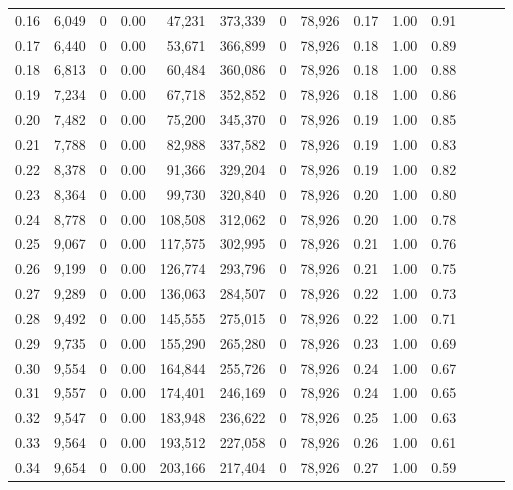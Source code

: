 \begin{tabular}{rrrrrrrrrrrrrr}
0.16 &  6,049 &      0 &  0.00 &   47,231 &  373,339 &       0 &  78,926 &  0.17 &  1.00 &      0.91 \\
0.17 &  6,440 &      0 &  0.00 &   53,671 &  366,899 &       0 &  78,926 &  0.18 &  1.00 &      0.89 \\
0.18 &  6,813 &      0 &  0.00 &   60,484 &  360,086 &       0 &  78,926 &  0.18 &  1.00 &      0.88 \\
0.19 &  7,234 &      0 &  0.00 &   67,718 &  352,852 &       0 &  78,926 &  0.18 &  1.00 &      0.86 \\
0.20 &  7,482 &      0 &  0.00 &   75,200 &  345,370 &       0 &  78,926 &  0.19 &  1.00 &      0.85 \\
0.21 &  7,788 &      0 &  0.00 &   82,988 &  337,582 &       0 &  78,926 &  0.19 &  1.00 &      0.83 \\
0.22 &  8,378 &      0 &  0.00 &   91,366 &  329,204 &       0 &  78,926 &  0.19 &  1.00 &      0.82 \\
0.23 &  8,364 &      0 &  0.00 &   99,730 &  320,840 &       0 &  78,926 &  0.20 &  1.00 &      0.80 \\
0.24 &  8,778 &      0 &  0.00 &  108,508 &  312,062 &       0 &  78,926 &  0.20 &  1.00 &      0.78 \\
0.25 &  9,067 &      0 &  0.00 &  117,575 &  302,995 &       0 &  78,926 &  0.21 &  1.00 &      0.76 \\
0.26 &  9,199 &      0 &  0.00 &  126,774 &  293,796 &       0 &  78,926 &  0.21 &  1.00 &      0.75 \\
0.27 &  9,289 &      0 &  0.00 &  136,063 &  284,507 &       0 &  78,926 &  0.22 &  1.00 &      0.73 \\
0.28 &  9,492 &      0 &  0.00 &  145,555 &  275,015 &       0 &  78,926 &  0.22 &  1.00 &      0.71 \\
0.29 &  9,735 &      0 &  0.00 &  155,290 &  265,280 &       0 &  78,926 &  0.23 &  1.00 &      0.69 \\
0.30 &  9,554 &      0 &  0.00 &  164,844 &  255,726 &       0 &  78,926 &  0.24 &  1.00 &      0.67 \\
0.31 &  9,557 &      0 &  0.00 &  174,401 &  246,169 &       0 &  78,926 &  0.24 &  1.00 &      0.65 \\
0.32 &  9,547 &      0 &  0.00 &  183,948 &  236,622 &       0 &  78,926 &  0.25 &  1.00 &      0.63 \\
0.33 &  9,564 &      0 &  0.00 &  193,512 &  227,058 &       0 &  78,926 &  0.26 &  1.00 &      0.61 \\
0.34 &  9,654 &      0 &  0.00 &  203,166 &  217,404 &       0 &  78,926 &  0.27 &  1.00 &      0.59 \\

\end{tabular}
